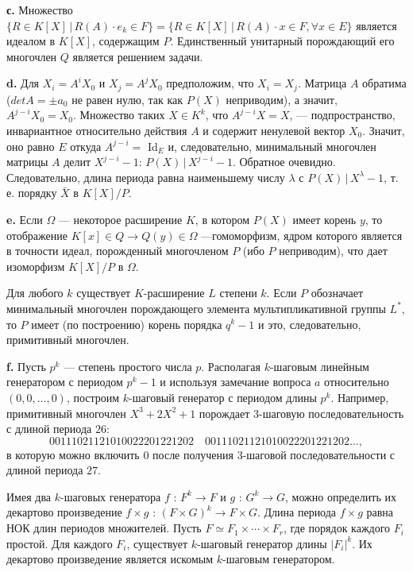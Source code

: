 \documentclass{mai_book}
\begin{document}
\textbf{с. } Множество $\{R \in K[X] \, | \, R(A) \cdot e_k \in F\} = \{R \in K[X] \, | \, R(A) \cdot x \in F, \forall x \in E\}$ является идеалом в $K[X]$, содержащим $P$. Единственный унитарный порождающий его многочлен $Q$ является решением задачи. \smallskip

\textbf{d. } Для $X_i = A^i X_0$ и $X_j = A^j X_0$ предположим, что $X_i = X_j$.  Матрица $A$ обратима ($det A = \pm a_0$ не равен нулю, так как $P(X)$ неприводим), а значит, $A^{j-i}X_0 = X_0$. Множество таких $X \in K^k$, что $A^{j-i}X = X$, --- подпространство, инвариантное относительно действия $A$ и  содержит ненулевой вектор $X_0$. Значит, оно равно $E$ откуда $A^{j-i} =$ Id$_E$ и, следовательно, минимальный многочлен матрицы $A$ делит $X^{j-i} - 1$: $P(X) \, | \, X^{j-i} - 1$. Обратное очевидно. Следовательно, длина периода равна наименьшему числу $\lambda$ с $P(X) \, | \, X^{\lambda} - 1$, т. е. порядку $\bar{X}$ в $K[X]/P$. \smallskip

\textbf{e. } Если $\Omega$ --- некоторое расширение $K$, в котором $P(X)$ имеет  корень $y$, то отображение $K[x] \in Q \to Q(y) \in \Omega$ ---гомоморфизм, ядром которого является в точности идеал, порожденный многочленом $P$ (ибо $P$ неприводим), что дает изоморфизм $K[X]/P$ в $\Omega$. \par
Для любого $k$ существует $K$-расширение $L$ степени $k$. Если $P$  обозначает минимальный многочлен порождающего элемента  мультипликативной группы $L^*$, то $P$ имеет (по построению) корень порядка $q^k-1$ и это, следовательно, примитивный многочлен. \smallskip

\textbf{f. } Пусть $p^k$ --- степень простого числа $p$. Располагая $k$-шаговым  линейным генератором с периодом $p^k-1$ и используя замечание вопроса $a$ относительно $(0,0,\dots,0)$, построим $k$-шаговый генератор с периодом длины $p^k$. Например, примитивный многочлен $X^3+2X^2+1$ порождает $3$-шаговую последовательность с длиной периода $26$:
$$
	00111021121010022201221202 \quad 00111021121010022201221202\dots ,
$$
в которую можно включить $0$ после получения $3$-шаговой последовательности с длиной периода $27$.\par
Имея два $k$-шаговых генератора $f$ : $F^k \to F$ и $g$ : $G^k \to G$, можно определить их декартово произведение $f \times g$ : $(F \times G)^k \to F \times G$. Длина периода $f \times g$ равна НОК длин периодов множителей. Пусть $F \simeq F_1 \times \cdots \times F_r$, где порядок каждого $F_i$ простой. Для каждого $F_i$, существует $k$-шаговый генератор длины $|F_i|^k$. Их декартово произведение является искомым $k$-шаговым генератором. \\
\end{document}
